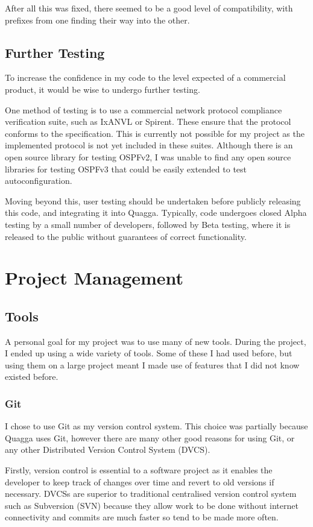 \documentclass[12pt,a4paper,twoside]{report}
\begin{document}
After all this was fixed, there seemed to be a good level of compatibility,
with prefixes from one finding their way into the other.

\section{Further Testing}
To increase the confidence in my code to the level expected of a commercial
product, it would be wise to undergo further testing. 

One method of testing is to use a commercial network protocol compliance
verification suite, such as IxANVL or Spirent. These ensure that the protocol
conforms to the specification. This is currently not possible for my project as
the implemented protocol is not yet included in these suites.  Although there
is an open source library for testing OSPFv2, I was unable to find any open
source libraries for testing OSPFv3 that could be easily extended to test
autoconfiguration. 

Moving beyond this, user testing should be undertaken before publicly releasing
this code, and integrating it into Quagga. Typically, code undergoes closed
Alpha testing by a small number of developers, followed by Beta testing, where
it is released to the public without guarantees of correct functionality.

\chapter{Project Management}
\section{Tools}
A personal goal for my project was to use many of new tools. During the
project, I ended up using a wide variety of tools. Some of these I had used
before, but using them on a large project meant I made use of features that I
did not know existed before.

\subsection{Git}
I chose to use Git as my version control system. This choice was
partially because Quagga uses Git, however there are many other good reasons for
using Git, or any other Distributed Version Control System (DVCS).

Firstly, version control is essential to a software project as it enables the
developer to keep track of changes over time and revert to old versions if
necessary. DVCSs are superior to traditional centralised version control
system such as Subversion (SVN) because they allow work to be done without internet
connectivity and commits are much faster so tend to be made more often. 
\end{document}
